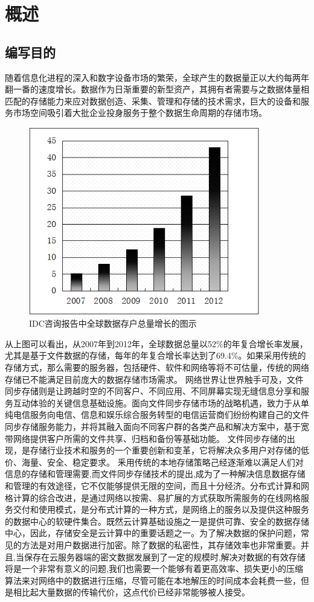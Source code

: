 \documentclass[UTF8]{ctexart}
\begin{document}
\newpage
\section{概述}
\subsection{编写目的}
随着信息化进程的深入和数字设备市场的繁荣，全球产生的数据量正以大约每两年翻一番的速度增长。数据作为日渐重要的新型资产，其拥有者需要与之数据体量相匹配的存储能力来应对数据创造、采集、管理和存储的技术需求，巨大的设备和服务市场空间吸引着大批企业投身服务于整个数据生命周期的存储市场。
\begin{figure}[H]
  \centering
  \includegraphics[width=0.9\textwidth]{part-one-1.png}
  \caption{IDC咨询报告中全球数据存户总量增长的图示}
\end{figure}
从上图可以看出，从2007年到2012年，全球数据总量以52\%的年复合增长率发展，尤其是基于文件数据的存储，每年的年复合增长率达到了69.4\%。如果采用传统的存储方式，那么需要的服务器，包括硬件、软件和网络等将不可估量，传统的网络存储已不能满足目前庞大的数据存储市场需求。
网络世界让世界触手可及，文件同步存储则是让跨越时空的不同客户、不同应用、不同屏幕实现无缝信息分享和服务互动体验的关键信息基础设施。面向文件同步存储市场的战略机遇，致力于从单纯电信服务向电信、信息和娱乐综合服务转型的电信运营商们纷纷构建自己的文件同步存储服务能力，并将其融入面向不同客户群的各类产品和解决方案中，基于宽带网络提供客户所需的文件共享、归档和备份等基础功能。
文件同步存储的出现，是存储行业技术和服务的一个重要创新和变革，它将解决众多用户对存储的低价、海量、安全、稳定要求。
釆用传统的本地存储策略己经逐渐难以满足人们对信息的存储和管理需要,而文件同步存储技术的提出,成为了一种解决信息数据存储和管理的有效途径，它不仅能够提供无限的空间，而且十分经济。分布式计算和网格计算的综合改进，是通过网络以按需、易扩展的方式获取所需服务的在线网格服务交付和使用模式，是分布式计算的一种方式，是网络上的服务以及提供这种服务的数据中心的软硬件集合。既然云计算基础设施之一是提供可靠、安全的数据存储中心，因此，存储安全是云计算中的重要话题之一。为了解决数据的保护问题，常见的方法是对用户数据进行加密。除了数据的私密性，其存储效率也非常重要。并且,当保存在云服务器端的密文数据发展到了一定的规模时,解决对数据的有效存储将是一个非常有意义的问题,我们也需要一个能够有着更高效率、损失更小的压缩算法来对网络中的数据进行压缩，尽管可能在本地解压的时间成本会耗费一些，但是相比起大量数据的传输代价，这点代价已经非常能够被人接受。
\end{document}

